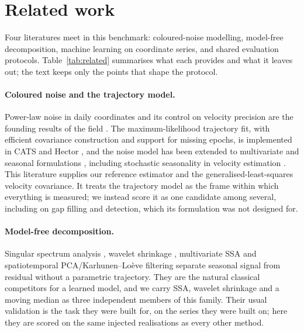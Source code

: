 \section{Related work}
\label{sec:related}

Four literatures meet in this benchmark: coloured-noise modelling, model-free
decomposition, machine learning on coordinate series, and shared evaluation
protocols. Table~\ref{tab:related} summarises what each provides and what it
leaves out; the text keeps only the points that shape the protocol.

\paragraph{Coloured noise and the trajectory model.}
Power-law noise in daily coordinates and its control on velocity precision are
the founding results of the field \citep{mao1999noise,williams2003coloured}.
The maximum-likelihood trajectory fit, with efficient covariance construction and
support for missing epochs, is implemented in CATS \citep{williams2008cats} and
Hector \citep{bos2008fast,bos2013fast}, and the noise model has been extended to
multivariate and seasonal formulations
\citep{amirisimkooei2007noise,amirisimkooei2009multivariate,klos2018seasonal},
including stochastic seasonality in velocity estimation
\citep{xu2025velocity}.
This literature supplies our reference estimator and the generalised-least-squares
velocity covariance. It treats the trajectory model as the frame within which
everything is measured; we instead score it as one candidate among several,
including on gap filling and detection, which its formulation was not designed
for.

\paragraph{Model-free decomposition.}
Singular spectrum analysis \citep{wdowinski1997spatial,ji2024ssa}, wavelet
shrinkage \citep{ji2020wavelet}, multivariate SSA
\citep{gruszczynska2017mssa} and spatiotemporal PCA/Karhunen--Lo\`eve filtering
\citep{dong2006spatiotemporal} separate seasonal signal from residual without a
parametric trajectory. They are
the natural classical competitors for a learned model, and we carry SSA, wavelet
shrinkage and a moving median as three independent members of this family. Their
usual validation is the task they were built for, on the series they were built
on; here they are scored on the same injected realisations as every other method.


